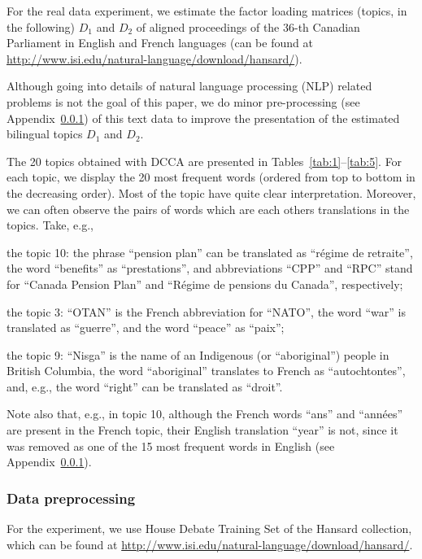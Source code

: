\documentclass{article}
\newenvironment{mi}{%
  \begin{list}{-}{}
  \let\olditem\item
}{%
  \end{list}
}
\begin{document}
For the real data experiment, we estimate the factor loading matrices (topics, in the following) $D_1$ and $D_2$ of aligned proceedings of the 36-th Canadian Parliament in English and French languages (can be found at \href{http://www.isi.edu/natural-language/download/hansard/}{http://www.isi.edu/natural-language/download/hansard/}). 

Although going into details of natural language processing (NLP) related problems is not the goal of this paper, we do minor pre-processing (see Appendix~\ref{app:translation-preprocess}) of this text data to improve the presentation of the estimated bilingual topics $D_1$ and $D_2$.

The 20 topics obtained with DCCA are presented in Tables~\ref{tab:1}--\ref{tab:5}. For each topic, we display the 20 most frequent words (ordered from top to bottom in the decreasing order). Most of the topic have quite clear interpretation. Moreover, we can often observe the pairs of words which are each others translations in the topics. Take, e.g., 
\begin{mi}
\item 
the topic 10: the phrase ``pension plan'' can be translated as ``r\'egime de retraite'', the word ``benefits'' as ``prestations'', and abbreviations ``CPP'' and ``RPC'' stand for ``Canada Pension Plan'' and ``R\'egime de pensions du Canada'', respectively;
\item 
the topic 3: ``OTAN'' is the French abbreviation for ``NATO'', the word ``war'' is translated as ``guerre'', and the word ``peace'' as ``paix'';
\item
the topic 9: ``Nisga'' is the name of an Indigenous (or ``aboriginal'') people in British Columbia, the word ``aboriginal'' translates to French as ``autochtontes'', and, e.g., the word ``right'' can be translated as ``droit''.
\end{mi}
Note also that, e.g., in topic 10, although the French words ``ans'' and ``ann\'ees'' are present in the French topic, their English translation ``year'' is not, since it was removed as one of the 15 most frequent words in English (see Appendix~\ref{app:translation-preprocess}).





\subsubsection{Data preprocessing} 
\label{app:translation-preprocess}
For the experiment, we use House Debate Training Set of the Hansard collection, which can be found at \href{http://www.isi.edu/natural-language/download/hansard/}{http://www.isi.edu/natural-language/download/hansard/}.
\end{document}
